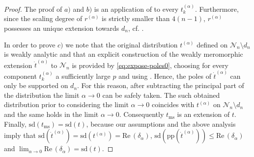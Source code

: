 \documentclass[a4paper,10pt,twoside]{article}
\numberwithin{equation}{section}
\newcounter{and}
\def\N{\mathcal{N}}
\def\Ree{\mathrm{Re}\,}
\def\pp{\mathrm{pp}}
\def\sd{\mathrm{sd}}
\def\ms{\mathrm{ms}}
\theoremstyle{plain}
\theoremstyle{definition}
\begin{document}
\begin{proof}
The proof of $a)$ and $b)$ is an application of \cite[Theorem 3.2.3]{Hormander} to every $t^{(\alpha)}_k$. Furthermore, since the scaling degree of $r^{(\alpha)}$ is strictly smaller than $4(n-1)$, $r^{(\alpha)}$ possesses an unique extension towards $d_n$, cf. \cite[Theorem 5.2]{Brunetti-Fredenhagen:2000}.

In order to prove $c)$ we note that the original distribution $t^{(\alpha)}$ defined on $\N_n\setminus d_n$ is weakly analytic and that an explicit construction of the weakly meromorphic extension $\dot{t}^{(\alpha)}$ to $\N_n$ is provided by 
\eqref{eq:expose-poles0}, choosing for every component $t^{(\alpha)}_k$ a sufficiently large $p$ and using \cite[Theorem 5.2]{Brunetti-Fredenhagen:2000}. Hence, the poles of $\dot{t}^{(\alpha)}$ can only be supported on $d_n$. For this reason, after subtracting the principal part of the distribution the limit $\alpha \to 0$ can be safely taken. The such obtained distribution prior to considering the limit $\alpha \to 0$ coincides with $t^{(\alpha)}$ on $\N_n\setminus d_n$ and the same holds in the limit $\alpha\to 0$. Consequently $t_\ms$ is an extension of $t$. Finally, $\sd(t_\ms)=\sd(t)$, because our assumptions and the above analysis imply that $\sd(\dot{t}^{(\alpha)})=\sd(t^{(\alpha)})=\Ree(\delta_\alpha)$, $\sd(\pp(\dot{t}^{(\alpha)}))\le \Ree(\delta_\alpha)$ and $\lim_{\alpha\to 0}\Ree(\delta_\alpha) = \sd(t)$.
\end{proof}
\end{document}
